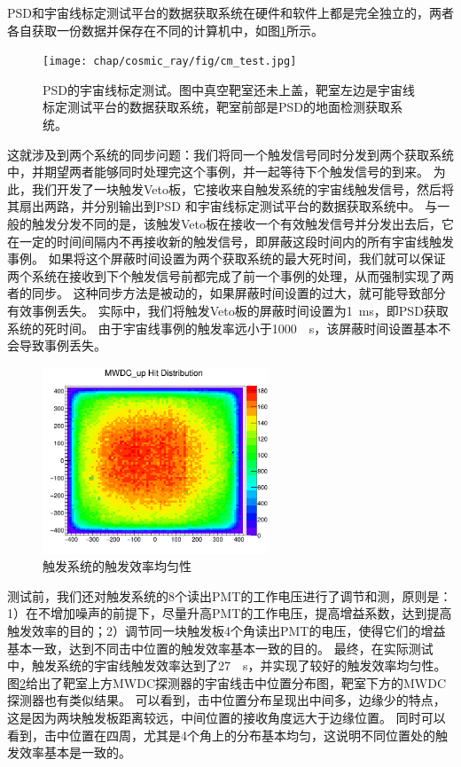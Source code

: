 PSD和宇宙线标定测试平台的数据获取系统在硬件和软件上都是完全独立的，两者各自获取一份数据并保存在不同的计算机中，如图\ref{fig:cosmic_ray:cm_test}所示。
\label{sec:cosmic_ray:cm_test}
\begin{figure}[htbp]
	\centering
	\texttt{[image: chap/cosmic\_ray/fig/cm\_test.jpg]}
	\caption{PSD的宇宙线标定测试。图中真空靶室还未上盖，靶室左边是宇宙线标定测试平台的数据获取系统，靶室前部是PSD的地面检测获取系统。}
	\label{fig:cosmic_ray:cm_test}
\end{figure}
这就涉及到两个系统的同步问题：我们将同一个触发信号同时分发到两个获取系统中，并期望两者能够同时处理完这个事例，并一起等待下个触发信号的到来。
为此，我们开发了一块触发Veto板，它接收来自触发系统的宇宙线触发信号，然后将其扇出两路，并分别输出到PSD
和宇宙线标定测试平台的数据获取系统中。
与一般的触发分发不同的是，该触发Veto板在接收一个有效触发信号并分发出去后，它在一定的时间间隔内不再接收新的触发信号，即屏蔽这段时间内的所有宇宙线触发事例。
如果将这个屏蔽时间设置为两个获取系统的最大死时间，我们就可以保证两个系统在接收到下个触发信号前都完成了前一个事例的处理，从而强制实现了两者的同步。
这种同步方法是被动的，如果屏蔽时间设置的过大，就可能导致部分有效事例丢失。
实际中，我们将触发Veto板的屏蔽时间设置为\SI{1}{ms}，即PSD获取系统的死时间。
由于宇宙线事例的触发率远小于\SI{1000}{\per\second}，该屏蔽时间设置基本不会导致事例丢失。

\begin{figure}[!h]
\centering
\includegraphics[width=0.6\textwidth]{chap/cosmic_ray/fig/hitposition_mwdc.png}
\caption{触发系统的触发效率均匀性}
\label{fig:cosmic_ray:hitposition}
\end{figure}

测试前，我们还对触发系统的8个读出PMT的工作电压进行了调节和测，原则是：1）在不增加噪声的前提下，尽量升高PMT的工作电压，提高增益系数，达到提高触发效率的目的；2）调节同一块触发板4个角读出PMT的电压，使得它们的增益基本一致，达到不同击中位置的触发效率基本一致的目的。
最终，在实际测试中，触发系统的宇宙线触发效率达到了\SI{27}{\per\second}，并实现了较好的触发效率均匀性。
图\ref{fig:cosmic_ray:hitposition}给出了靶室上方MWDC探测器的宇宙线击中位置分布图，靶室下方的MWDC探测器也有类似结果。
可以看到，击中位置分布呈现出中间多，边缘少的特点，这是因为两块触发板距离较远，中间位置的接收角度远大于边缘位置。
同时可以看到，击中位置在四周，尤其是4个角上的分布基本均匀，这说明不同位置处的触发效率基本是一致的。

